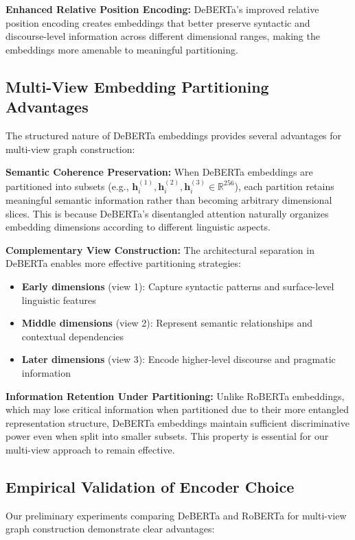 \textbf{Enhanced Relative Position Encoding:} DeBERTa's improved relative position encoding creates embeddings that better preserve syntactic and discourse-level information across different dimensional ranges, making the embeddings more amenable to meaningful partitioning.

\subsection{Multi-View Embedding Partitioning Advantages}

The structured nature of DeBERTa embeddings provides several advantages for multi-view graph construction:

\textbf{Semantic Coherence Preservation:} When DeBERTa embeddings are partitioned into subsets (e.g., $\mathbf{h}_i^{(1)}, \mathbf{h}_i^{(2)}, \mathbf{h}_i^{(3)} \in \mathbb{R}^{256}$), each partition retains meaningful semantic information rather than becoming arbitrary dimensional slices. This is because DeBERTa's disentangled attention naturally organizes embedding dimensions according to different linguistic aspects.

\textbf{Complementary View Construction:} The architectural separation in DeBERTa enables more effective partitioning strategies:
\begin{itemize}
    \item \textbf{Early dimensions} (view 1): Capture syntactic patterns and surface-level linguistic features
    \item \textbf{Middle dimensions} (view 2): Represent semantic relationships and contextual dependencies  
    \item \textbf{Later dimensions} (view 3): Encode higher-level discourse and pragmatic information
\end{itemize}

\textbf{Information Retention Under Partitioning:} Unlike RoBERTa embeddings, which may lose critical information when partitioned due to their more entangled representation structure, DeBERTa embeddings maintain sufficient discriminative power even when split into smaller subsets. This property is essential for our multi-view approach to remain effective.

\subsection{Empirical Validation of Encoder Choice}

Our preliminary experiments comparing DeBERTa and RoBERTa for multi-view graph construction demonstrate clear advantages:

